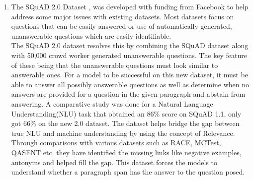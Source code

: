 \documentclass[11pt]{article}
\begin{document}
	\begin{enumerate}
		\item The SQuAD 2.0 Dataset \citep{dataset}, was developed with funding from Facebook to help address some major issues with existing datasets. Most datasets focus on questions that can be easily answered or use of automatically generated, unanswerable questions which are easily identifiable.\\
		The SQuAD 2.0 dataset resolves this by combining the SQuAD dataset along with 50,000 crowd worker generated unanswerable questions. The key feature of these being that the unanswerable questions must look similar to answerable ones. For a model to be successful on this new dataset, it must be able to answer all possibly answerable questions as well as determine when no answers are provided for a question in the given paragraph and abstain from answering. A comparative study was done for a Natural Language Understanding(NLU) task that obtained an 86\% score on SQuAD 1.1, only got 66\% on the new 2.0 dataset.
		The dataset helps bridge the gap between true NLU and machine understanding by using the concept of Relevance. Through comparisons with various datasets such as RACE, MCTest, QASENT etc. they have identified the missing links like negative examples, antonyms and helped fill the gap. This dataset forces the models to understand whether a paragraph span has the answer to the question posed.


\end{enumerate}
\end{document}
